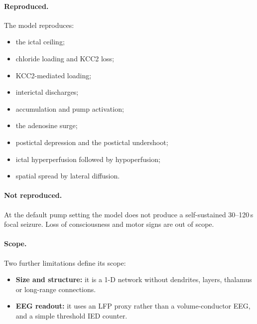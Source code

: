 \paragraph{Reproduced.} The model reproduces:
\begin{itemize}
\item the ictal \Kp{} ceiling;
\item chloride loading and KCC2 loss;
\item KCC2-mediated \Kp{} loading;
\item interictal discharges;
\item \Nap{} accumulation and pump activation;
\item the adenosine surge;
\item postictal depression and the postictal \Kp{} undershoot;
\item ictal hyperperfusion followed by hypoperfusion;
\item spatial spread by lateral diffusion.
\end{itemize}

\paragraph{Not reproduced.} At the default pump setting the model does not produce a self-sustained 30--120\,s focal seizure. Loss of consciousness and motor signs are out of scope.

\paragraph{Scope.} Two further limitations define its scope:
\begin{itemize}
\item \textbf{Size and structure:} it is a 1-D network without dendrites, layers, thalamus or long-range connections.
\item \textbf{EEG readout:} it uses an LFP proxy rather than a volume-conductor EEG, and a simple threshold IED counter.
\end{itemize}
